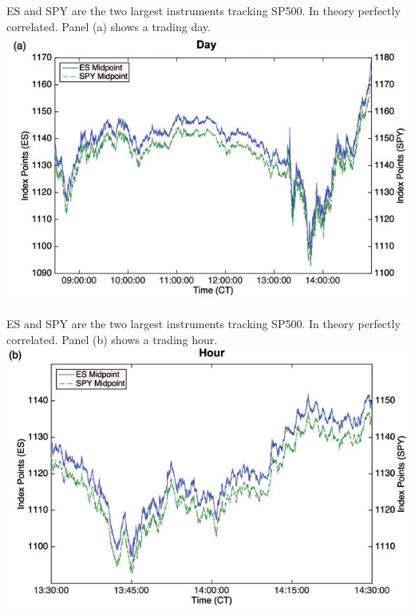 \documentclass[english,10pt
,aspectratio=169
]{beamer}
\begin{document}
\begin{frame}[noframenumbering]{\citet*{budish_high-frequency_2015}}
	ES and SPY are the two largest instruments tracking SP500. In theory perfectly correlated. Panel (a) shows a trading day.
	\center
	\includegraphics[scale=0.7]{pics/HTF_Corr_1}
\end{frame}


\begin{frame}[noframenumbering]{\citet*{budish_high-frequency_2015}}
	ES and SPY are the two largest instruments tracking SP500. In theory perfectly correlated. Panel (b) shows a trading hour.
	\center
	\includegraphics[scale=0.7]{pics/HTF_Corr_2}
\end{frame}
\end{document}
